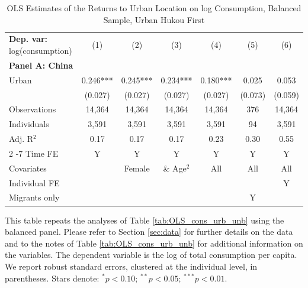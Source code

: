 \begin{table}[htbp] \centering \begin{threeparttable}
 \caption{OLS Estimates of the Returns to Urban Location on log Consumption, Balanced Sample, Urban Hukou First} 
 \label{tab:OLS_CHN_hukou_urban_first_consumption_urban_bal} 
\begin{tabular}{l cccccc} \toprule  \textbf{Dep. var:}  log(consumption) 
                    &\multicolumn{1}{c}{(1)}   &\multicolumn{1}{c}{(2)}   &\multicolumn{1}{c}{(3)}   &\multicolumn{1}{c}{(4)}   &\multicolumn{1}{c}{(5)}   &\multicolumn{1}{c}{(6)}   \\
\textbf{Panel A: China} \\
Urban               &       0.246***&       0.245***&       0.234***&       0.180***&       0.025   &       0.053   \\
                    &     (0.027)   &     (0.027)   &     (0.027)   &     (0.027)   &     (0.073)   &     (0.059)   \\
\addlinespace
Observations        &      14,364   &      14,364   &      14,364   &      14,364   &         376   &      14,364   \\
Individuals         &       3,591   &       3,591   &       3,591   &       3,591   &          94   &       3,591   \\
Adj. R$^{2}$        &        0.17   &        0.17   &        0.17   &        0.23   &        0.30   &        0.55   \\
\cmidrule{2 -7} Time FE & Y & Y & Y & Y & Y & Y \\ Covariates & & Female & \& Age$^2$ & All & All & All \\ Individual FE & & & & & & Y \\ Migrants only & & & & & Y & \\ \bottomrule \end{tabular} \begin{tablenotes}[flushleft] \footnotesize \item{This table repeats the analyses of Table \ref{tab:OLS_cons_urb_unb}  using the balanced panel. Please refer to Section \ref{sec:data} for further details on the data and to the notes of Table \ref{tab:OLS_cons_urb_unb} for additional information on the variables. The dependent variable is the log of total consumption per capita. We report robust standard errors, clustered at the individual level, in parentheses. Stars denote: $^{*} p<0.10$; $^{**} p<0.05$; $^{***} p<0.01$.} \end{tablenotes} \end{threeparttable} \end{table}
